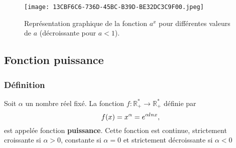 \documentclass[oneside,11pt,french,table]{book}
\theoremstyle{definition}
\theoremstyle{plain}
\theoremstyle{remark}
\begin{document}
 \begin{figure}[!h]
     \centering
     \texttt{[image: 13CBF6C6-736D-45BC-B39D-BE32DC3C9F00.jpeg]}
     \caption{Représentation graphique de la fonction $a^x$ pour différentes valeurs de $a$ (décroissante pour $a<1$). }
     \label{fonctionpuissance}
 \end{figure}
 
 \subsection{Fonction puissance }
 \subsubsection{Définition} Soit $\alpha$ un nombre réel fixé. La fonction $f: \mathbb{R}_+^*\to \mathbb{R}_+^*$ définie par  $$ f(x)=x^{\alpha}=e^{\alpha\\ln{x}},$$ est appelée fonction \textbf{puissance}. Cette fonction est continue, strictement croissante si $\alpha>0$, constante si $\alpha=0$ et strictement décroissante si $\alpha<0$
\end{document}

